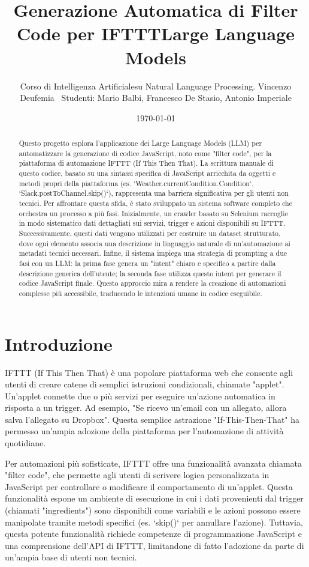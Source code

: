 \documentclass[sigconf,natbib=false]{acmart}
\title{\textbf{Generazione Automatica di Filter Code per IFTTT\tramite Large Language Models}}
\author{Corso di Intelligenza Artificiale\Progetto su Natural Language Processing\Prof. Vincenzo Deufemia\ \vspace{0.2cm} Studenti: Mario Balbi, Francesco De Stasio, Antonio Imperiale}
\date{\today}
\begin{document}
\begin{abstract}
Questo progetto \cite{schulman2017ppo} esplora l'applicazione dei Large Language Models (LLM) per automatizzare la generazione di codice JavaScript, noto come "filter code", per la piattaforma di automazione IFTTT (If This Then That). La scrittura manuale di questo codice, basato su una sintassi specifica di JavaScript arricchita da oggetti e metodi propri della piattaforma (es. `Weather.currentCondition.Condition`, `Slack.postToChannel.skip()`), rappresenta una barriera significativa per gli utenti non tecnici. Per affrontare questa sfida, è stato sviluppato un sistema software completo che orchestra un processo a più fasi. Inizialmente, un crawler basato su Selenium raccoglie in modo sistematico dati dettagliati sui servizi, trigger e azioni disponibili su IFTTT. Successivamente, questi dati vengono utilizzati per costruire un dataset strutturato, dove ogni elemento associa una descrizione in linguaggio naturale di un'automazione ai metadati tecnici necessari. Infine, il sistema impiega una strategia di prompting a due fasi con un LLM: la prima fase genera un "intent" chiaro e specifico a partire dalla descrizione generica dell'utente; la seconda fase utilizza questo intent per generare il codice JavaScript finale. Questo approccio mira a rendere la creazione di automazioni complesse più accessibile, traducendo le intenzioni umane in codice eseguibile.
\end{abstract}

\maketitle
\pagestyle{plain}

\section{Introduzione}
IFTTT (If This Then That) è una popolare piattaforma web che consente agli utenti di creare catene di semplici istruzioni condizionali, chiamate "applet". Un'applet connette due o più servizi per eseguire un'azione automatica in risposta a un trigger. Ad esempio, "Se ricevo un'email con un allegato, allora salva l'allegato su Dropbox". Questa semplice astrazione "If-This-Then-That" ha permesso un'ampia adozione della piattaforma per l'automazione di attività quotidiane.

Per automazioni più sofisticate, IFTTT offre una funzionalità avanzata chiamata "filter code", che permette agli utenti di scrivere logica personalizzata in JavaScript per controllare o modificare il comportamento di un'applet. Questa funzionalità espone un ambiente di esecuzione in cui i dati provenienti dal trigger (chiamati "ingredients") sono disponibili come variabili e le azioni possono essere manipolate tramite metodi specifici (es. `skip()` per annullare l'azione). Tuttavia, questa potente funzionalità richiede competenze di programmazione JavaScript e una comprensione dell'API di IFTTT, limitandone di fatto l'adozione da parte di un'ampia base di utenti non tecnici.
\end{document}

